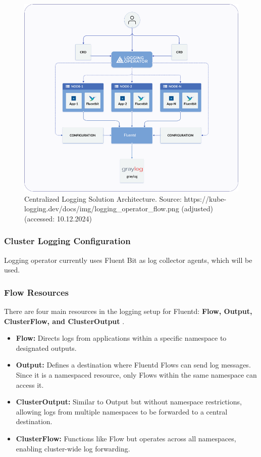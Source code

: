 \documentclass[../main.tex]{subfiles}
\begin{document}
\begin{figure}[H]
        \centering
        \includegraphics[]{img/2-background/centralized_logging/architecture.png}
        \caption{Centralized Logging Solution Architecture. Source: https://kube-logging.dev/docs/img/logging\_operator\_flow.png (adjusted) (accessed: 10.12.2024)}
        \label{fig:centralized_logging_architecture}
\end{figure}

\subsubsection{Cluster Logging Configuration}
Logging operator currently uses Fluent Bit as log collector agents, which will be used.

\subsubsection{Flow Resources}

There are four main resources in the logging setup for Fluentd: \textbf{Flow, Output, ClusterFlow, and ClusterOutput} \cite{logconfig}.  
\begin{itemize}
    \item \textbf{Flow:} Directs logs from applications within a specific namespace to designated outputs.
    \item \textbf{Output:} Defines a destination where Fluentd Flows can send log messages. Since it is a namespaced resource, only Flows within the same namespace can access it.
    \item \textbf{ClusterOutput:} Similar to Output but without namespace restrictions, allowing logs from multiple namespaces to be forwarded to a central destination.
    \item \textbf{ClusterFlow:} Functions like Flow but operates across all namespaces, enabling cluster-wide log forwarding.
\end{itemize}
\end{document}
